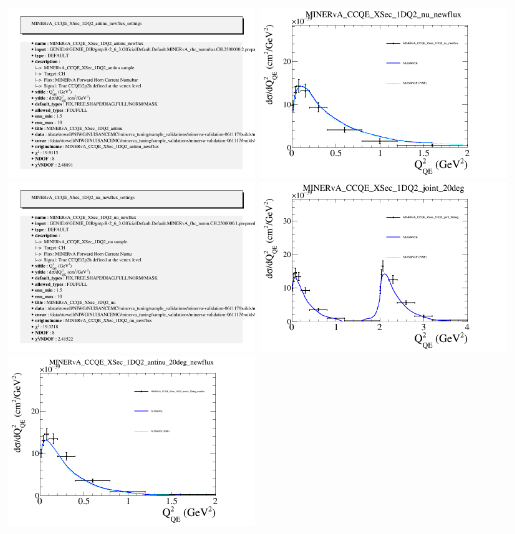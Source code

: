 \documentclass{article}
\begin{document}
\includegraphics[width=0.49\textwidth]{figures/nuisance_MINERvA_CCQE_XSec_1DQ2_antinu_newflux_info.png}
\centering
\includegraphics[width=0.49\textwidth]{figures/nuisance_MINERvA_CCQE_XSec_1DQ2_nu_newflux_comp.png}
\includegraphics[width=0.49\textwidth]{figures/nuisance_MINERvA_CCQE_XSec_1DQ2_nu_newflux_info.png}
\centering
\includegraphics[width=0.49\textwidth]{figures/nuisance_MINERvA_CCQE_XSec_1DQ2_joint_20deg_comp.png}
\\\centering
\includegraphics[width=0.49\textwidth]{figures/nuisance_MINERvA_CCQE_XSec_1DQ2_antinu_20deg_newflux_comp.png}
\end{document}
